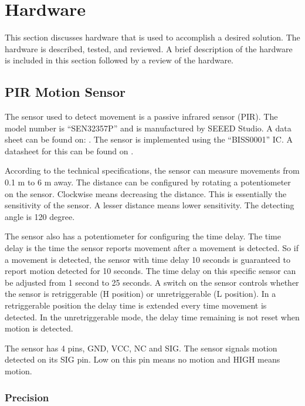 \section{Hardware}
This section discusses hardware that is used to accomplish a desired solution.  The hardware is described, tested, and reviewed. A brief description of the hardware is included in this section followed by a review of the hardware.

\subsection{PIR Motion Sensor}

The sensor used to detect movement is a passive infrared sensor (PIR). The model
number is \enquote{SEN32357P} and is manufactured by SEEED Studio. A data sheet
can be found on:
\cite{datasheet_pir1}. The
sensor is implemented using the \enquote{BISS0001} IC. A datasheet for this can
be found on \cite{datasheet_pir2}.

According to the technical specifications, the sensor can measure movements from 0.1 m to 6
m away. The distance can be configured by rotating a potentiometer on the
sensor. Clockwise means decreasing the distance. This is essentially the
sensitivity of the sensor. A lesser distance means lower sensitivity. The detecting angle is 120 degree.

The sensor also has a potentiometer for configuring the time delay. The time
delay is the time the sensor reports movement after a movement is detected. So
if a movement is detected, the sensor with time delay 10 seconds is guaranteed
to report motion detected for 10 seconds. The time delay on this specific sensor
can be adjusted from 1 second to 25 seconds. A switch on the sensor controls
whether the sensor is retriggerable (H position) or unretriggerable (L
position). In a retriggerable position the delay time is extended every time
movement is detected. In the unretriggerable mode, the delay time remaining is
not reset when motion is detected.

The sensor has 4 pins, GND, VCC, NC and SIG. The sensor signals motion detected
on its SIG pin. Low on this pin means no motion and HIGH means motion.

\subsubsection{Precision}
